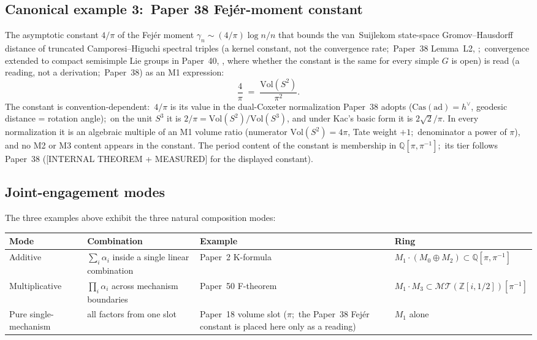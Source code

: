 \documentclass[11pt,a4paper]{article}
\theoremstyle{plain}
\theoremstyle{definition}
\newcommand{\Z}{\mathbb{Z}}
\newcommand{\Q}{\mathbb{Q}}
\newcommand{\Vol}{\mathrm{Vol}}
\newcommand{\MT}{\mathcal{MT}}
\begin{document}
\subsection{Canonical example 3:\ Paper 38 Fej\'er-moment constant}

The asymptotic constant $4/\pi$ of the Fej\'er moment
$\gamma_n \sim (4/\pi)\log n/n$ that bounds the van~Suijlekom
state-space Gromov--Hausdorff distance of truncated
Camporesi--Higuchi spectral triples (a kernel constant, not the
convergence rate;\ Paper~38 Lemma~L2,
\cite{loutey_paper38};\ convergence extended to compact semisimple Lie
groups in Paper~40, \cite{loutey_paper40}, where whether the constant
is the same for every simple $G$ is open) is read (a reading, not a
derivation;\ Paper~38) as an M1 expression:
\begin{equation}
\label{eq:propinquity_rate_M1}
\frac{4}{\pi} \;=\; \frac{\Vol(S^2)}{\pi^2}.
\end{equation}
The constant is convention-dependent:\ $4/\pi$ is its value in the
dual-Coxeter normalization Paper~38 adopts ($\mathrm{Cas}(\mathrm{ad})
= h^\vee$, geodesic distance = rotation angle);\ on the unit $S^3$ it
is $2/\pi = \Vol(S^2)/\Vol(S^3)$, and under Kac's basic form it is
$2\sqrt2/\pi$.  In every normalization it is an algebraic multiple of an
M1 volume ratio (numerator $\Vol(S^2) = 4\pi$, Tate weight $+1$;\
denominator a power of $\pi$), and no M2 or M3 content appears in the
constant.  The period content of the
constant is membership in $\Q[\pi,\pi^{-1}]$;\ its tier follows Paper~38
([INTERNAL THEOREM + MEASURED] for the displayed constant).

\subsection{Joint-engagement modes}

The three examples above exhibit the three natural composition modes:

\begin{center}
\renewcommand{\arraystretch}{1.15}
\begin{tabular}{@{}llll@{}}
\toprule
Mode & Combination & Example & Ring \\
\midrule
Additive & $\sum_i \alpha_i$ inside a single linear combination & Paper~2 K-formula & $M_1 \cdot (M_0 \oplus M_2) \subset \Q[\pi, \pi^{-1}]$ \\
Multiplicative & $\prod_i \alpha_i$ across mechanism boundaries & Paper~50 F-theorem & $M_1 \cdot M_3 \subset \MT(\Z[i, 1/2])[\pi^{-1}]$ \\
Pure single-mechanism & all factors from one slot & Paper~18 volume slot ($\pi$;\ the Paper~38 Fej\'er constant is placed here only as a reading) & $M_1$ alone \\
\bottomrule
\end{tabular}
\end{center}
\end{document}
